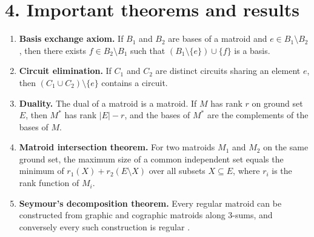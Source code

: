 \section*{4. Important theorems and results}
\begin{enumerate}[leftmargin=*,itemsep=0.35em]
\item \textbf{Basis exchange axiom.} If $B_1$ and $B_2$ are bases of a matroid and $e\in B_1\setminus B_2$, then there exists $f\in B_2\setminus B_1$ such that $(B_1\setminus\{e\})\cup\{f\}$ is a basis.

\item \textbf{Circuit elimination.} If $C_1$ and $C_2$ are distinct circuits sharing an element $e$, then $(C_1\cup C_2)\setminus\{e\}$ contains a circuit.

\item \textbf{Duality.} The dual of a matroid is a matroid. If $M$ has rank $r$ on ground set $E$, then $M^*$ has rank $|E|-r$, and the bases of $M^*$ are the complements of the bases of $M$.

\item \textbf{Matroid intersection theorem.} For two matroids $M_1$ and $M_2$ on the same ground set, the maximum size of a common independent set equals the minimum of $r_1(X)+r_2(E\setminus X)$ over all subsets $X\subseteq E$, where $r_i$ is the rank function of $M_i$.

\item \textbf{Seymour's decomposition theorem.} Every regular matroid can be constructed from graphic and cographic matroids along $3$-sums, and conversely every such construction is regular \cite{matroid_theory_ref2}.
\end{enumerate}

\theoryapplications
{}

